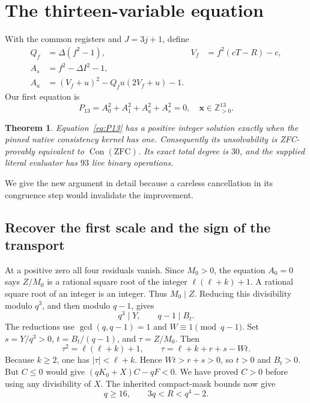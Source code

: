 \documentclass[11pt]{article}
\newcommand{\Zp}{\mathbb Z_{>0}}
\newcommand{\Con}{\operatorname{Con}}
\newtheorem{theorem}{Theorem}[section]
\theoremstyle{remark}
\begin{document}
\section{The thirteen-variable equation}
\label{sec:thirteen}

With the common registers and $J=3j+1$, define
\begin{align}
 Q_f&=\Delta(f^2-1),& V_f&=f^2(cT-R)-c,\\
 A_s&=f^2-\Delta I^2-1,\\
 A_a&=(V_f+u)^2-Q_fu(2V_f+u)-1.
\end{align}
Our first equation is
\begin{equation}
 \boxed{\;P_{13}=A_0^2+A_1^2+A_a^2+A_s^2=0,\quad
                 \mathbf x\in\Zp^{13}.\;}
 \label{eq:P13}
\end{equation}

\begin{theorem}
Equation~\eqref{eq:P13} has a positive integer solution exactly when the
pinned native consistency kernel has one. Consequently its unsolvability
is ZFC-provably equivalent to $\Con(\mathrm{ZFC})$. Its exact total degree
is $30$, and the supplied literal evaluator has $93$ live binary operations.
\end{theorem}

We give the new argument in detail because a careless cancellation in its
congruence step would invalidate the improvement.

\subsection{Recover the first scale and the sign of the transport}

At a positive zero all four residuals vanish. Since $M_0>0$, the equation
$A_0=0$ says $Z/M_0$ is a rational square root of the integer
$\ell(\ell+k)+1$. A rational square root of an integer is an integer.
Thus $M_0\mid Z$. Reducing this divisibility modulo $q^3$, and then
modulo $q-1$, gives
\[
 q^3\mid Y,\qquad q-1\mid B_t.
\]
The reductions use $\gcd(q,q-1)=1$ and $W\equiv1\pmod{q-1}$.
Set $s=Y/q^3>0$, $t=B_t/(q-1)$, and $\tau=Z/M_0$. Then
\begin{equation}
 \tau^2=\ell(\ell+k)+1,\qquad
 \tau=\ell+k+r+s-Wt.\label{eq:tau}
\end{equation}
Because $k\ge2$, one has $|\tau|<\ell+k$. Hence $Wt>r+s>0$,
so $t>0$ and $B_t>0$. But $C\le0$ would give
$(qK_0+X)C-qF<0$. We have proved $C>0$ before using any divisibility
of $X$. The inherited compact-mask bounds now give
\begin{equation}
 q\ge16,\qquad 3q<R<q^4-2.\label{eq:outerbounds}
\end{equation}
\end{document}
